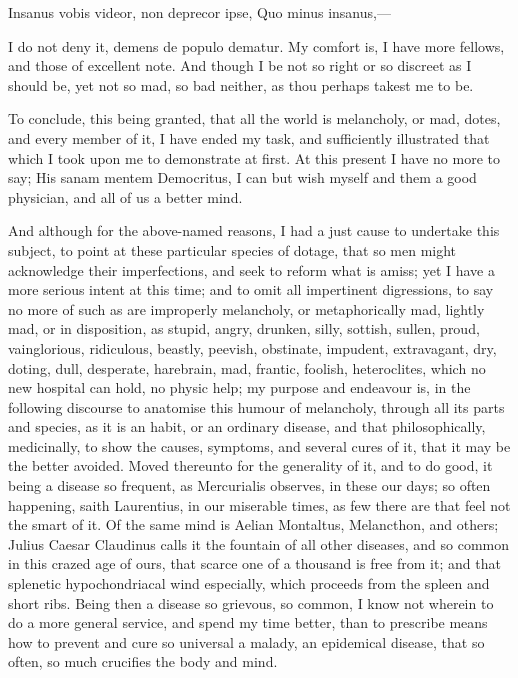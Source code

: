 {Insanus vobis videor, non deprecor ipse,
Quo minus insanus,---

I do not deny it, demens de populo dematur. My comfort is, I have more
fellows, and those of excellent note. And though I be not so right or
so discreet as I should be, yet not so mad, so bad neither, as thou
perhaps takest me to be.

To conclude, this being granted, that all the world is melancholy, or
mad, dotes, and every member of it, I have ended my task, and
sufficiently illustrated that which I took upon me to demonstrate at
first. At this present I have no more to say; His sanam mentem
Democritus, I can but wish myself and them a good physician, and all of
us a better mind.

And although for the above-named reasons, I had a just cause to
undertake this subject, to point at these particular species of dotage,
that so men might acknowledge their imperfections, and seek to reform
what is amiss; yet I have a more serious intent at this time; and to
omit all impertinent digressions, to say no more of such as are
improperly melancholy, or metaphorically mad, lightly mad, or in
disposition, as stupid, angry, drunken, silly, sottish, sullen, proud,
vainglorious, ridiculous, beastly, peevish, obstinate, impudent,
extravagant, dry, doting, dull, desperate, harebrain, \etc{} mad, frantic,
foolish, heteroclites, which no new  hospital can hold, no physic
help; my purpose and endeavour is, in the following discourse to
anatomise this humour of melancholy, through all its parts and species,
as it is an habit, or an ordinary disease, and that philosophically,
medicinally, to show the causes, symptoms, and several cures of it,
that it may be the better avoided. Moved thereunto for the generality
of it, and to do good, it being a disease so frequent, as 
Mercurialis observes, in these our days; so often happening, saith
 Laurentius, in our miserable times, as few there are that feel
not the smart of it. Of the same mind is Aelian Montaltus,
Melancthon, and others; Julius Caesar Claudinus calls it the
fountain of all other diseases, and so common in this crazed age of
ours, that scarce one of a thousand is free from it; and that splenetic
hypochondriacal wind especially, which proceeds from the spleen and
short ribs. Being then a disease so grievous, so common, I know not
wherein to do a more general service, and spend my time better, than to
prescribe means how to prevent and cure so universal a malady, an
epidemical disease, that so often, so much crucifies the body and mind.

}
